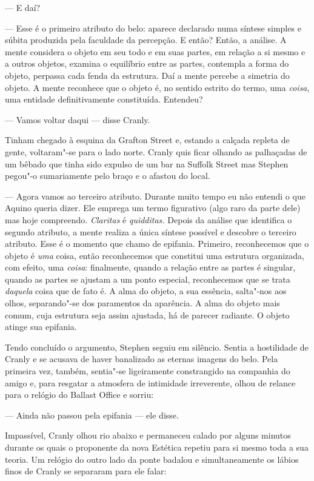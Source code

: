 --- E daí?

--- Esse é o primeiro atributo do belo: aparece declarado numa
síntese simples e súbita produzida pela faculdade da percepção. E
então?  Então, a análise.  A mente considera o objeto em seu todo e em
suas partes, em relação a si mesmo e a outros objetos, examina o
equilíbrio entre as partes, contempla a forma do objeto, perpassa cada
fenda da estrutura.  Daí a mente percebe a simetria do objeto.  A mente
reconhece que o objeto é, no sentido estrito do termo, uma
\textit{coisa}, uma entidade definitivamente constituída.  Entendeu?

--- Vamos voltar daqui --- disse Cranly.

Tinham chegado à esquina da Grafton Street e, estando a calçada
repleta de gente, voltaram"-se para o lado norte.  Cranly quis ficar
olhando as palhaçadas de um bêbado que tinha sido expulso de um bar na
Suffolk Street mas Stephen pegou"-o sumariamente pelo braço e o afastou
do local.

--- Agora vamos ao terceiro atributo.  Durante muito tempo eu não
entendi o que Aquino queria dizer.  Ele emprega um termo figurativo
(algo raro da parte dele) mas hoje compreendo.  \textit{Claritas} é
\textit{quidditas.}  Depois da análise que identifica o segundo
atributo, a mente realiza a única síntese possível e descobre o
terceiro atributo.  Esse é o momento que chamo de epifania.  Primeiro,
reconhecemos que o objeto é \textit{uma} coisa, então reconhecemos que
constitui uma estrutura organizada, com efeito, uma \textit{coisa}:
finalmente, quando a relação entre as partes é singular, quando as
partes se ajustam a um ponto especial, reconhecemos que se trata
\textit{daquela} coisa que de fato é.  A alma do objeto, a sua
essência, salta"-nos aos olhos, separando"-se dos paramentos da
aparência.  A alma do objeto mais comum, cuja estrutura seja assim
ajustada, há de parecer radiante.  O objeto atinge sua epifania.

Tendo concluído o argumento, Stephen seguiu em silêncio.  Sentia a
hostilidade de Cranly e se acusava de haver banalizado as eternas
imagens do belo.  Pela primeira vez, também, sentia"-se ligeiramente
constrangido na companhia do amigo e, para resgatar a atmosfera de
intimidade irreverente, olhou de relance para o relógio do Ballast
Office e sorriu:

--- Ainda não passou pela epifania --- ele disse.

Impassível, Cranly olhou rio abaixo e permaneceu calado por alguns
minutos durante os quais o proponente da nova Estética repetiu para si
mesmo toda a sua teoria.  Um relógio do outro lado da ponte badalou e
simultaneamente os lábios finos de Cranly se separaram para ele falar:

